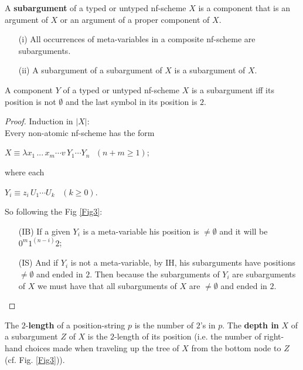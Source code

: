 \documentclass[a4paper,10pt]{article}
\begin{document}
\begin{mydef}[Subarguments] A \textbf{subargument} of a typed or untyped nf-scheme $X$ is a component that is an
argument of $X$ or an argument of a proper component of $X$. 
\end{mydef}

\begin{note}\label{8E2.2}
 \begin{itemize} The following notes will be useful:
  \item[(i)] All occurrences of meta-variables in a composite nf-scheme are subarguments.
  \item[(ii)] A subargument of a subargument of $X$ is a subargument of $X$.
 \end{itemize}
\end{note}

\begin{lem}\label{8E2.1} A component $Y$ of a typed or untyped nf-scheme $X$ is a subargument iff its position is not $\emptyset$
and the last symbol in its position is $2$.
 \begin{proof} Induction in $|X|$:\\
 
\noindent Every non-atomic nf-scheme has the form 
  \begin{center}
   $X \equiv \lambda x_1\, ...\, x_m \cdots v\,Y_1 \cdots Y_n\,\,\,\,(n + m \geq 1)$; 
  \end{center}
   where each
   \begin{center}
    $Y_i \equiv z_i\,U_1 \cdots U_k\,\,\,\,\,(k \geq 0)$.
   \end{center}
   So following the Fig \ref{Fig3}:
   \begin{itemize} 
    \item[(IB)] If a given $Y_i$ is a meta-variable his position is $\neq \emptyset$ and it will be $0^m 1^{(n-i)} 2$;
    \item[(IS)] And if $Y_i$ is not a meta-variable, by IH, his subarguments have positions $\neq \emptyset$ and ended in $2$. 
    Then because the subarguments of $Y_i$ are subarguments of $X$ we must have that all subarguments of $X$ are 
    $\neq \emptyset$ and ended in $2$.
   \end{itemize} 
 \end{proof}
\end{lem}


\begin{mydef} The $2$-\textbf{length} of a position-string $p$ is the number of $2$'s in $p$. The \textbf{depth in} $X$ of a 
subargument $Z$ of $X$ is the $2$-length of its position (i.e. the number of right-hand choices made when traveling up the tree of $X$ from
the bottom node to $Z$ (cf. Fig. \ref{Fig3})).
\end{mydef}
\end{document}
